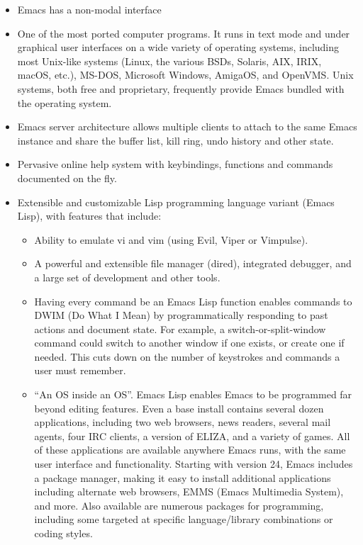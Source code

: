 \documentclass[10pt,twoside,openright]{memoir}
\begin{document}
\begin{itemize}
\item Emacs has a non-modal interface
\item One of the most ported computer programs. It runs in text mode and under graphical user interfaces on a wide variety of operating systems, including most Unix-like systems (Linux, the various BSDs, Solaris, AIX, IRIX, macOS, etc.), MS-DOS, Microsoft Windows, AmigaOS, and OpenVMS. Unix systems, both free and proprietary, frequently provide Emacs bundled with the operating system.
\item Emacs server architecture allows multiple clients to attach to the same Emacs instance and share the buffer list, kill ring, undo history and other state.
\item Pervasive online help system with keybindings, functions and commands documented on the fly.
\item Extensible and customizable Lisp programming language variant (Emacs Lisp), with features that include:
\begin{itemize}
\item Ability to emulate vi and vim (using Evil, Viper or Vimpulse).
\item A powerful and extensible file manager (dired), integrated debugger, and a large set of development and other tools.
\item Having every command be an Emacs Lisp function enables commands to DWIM (Do What I Mean) by programmatically responding to past actions and document state. For example, a switch-or-split-window command could switch to another window if one exists, or create one if needed. This cuts down on the number of keystrokes and commands a user must remember.
\item ``An OS inside an OS''. Emacs Lisp enables Emacs to be programmed far beyond editing features. Even a base install contains several dozen applications, including two web browsers, news readers, several mail agents, four IRC clients, a version of ELIZA, and a variety of games. All of these applications are available anywhere Emacs runs, with the same user interface and functionality. Starting with version 24, Emacs includes a package manager, making it easy to install additional applications including alternate web browsers, EMMS (Emacs Multimedia System), and more. Also available are numerous packages for programming, including some targeted at specific language/library combinations or coding styles.
\end{itemize}
\end{itemize}
\end{document}
